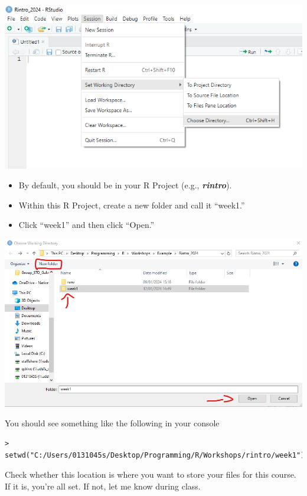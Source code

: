 \documentclass[
]{book}
\providecommand{\tightlist}{%
  \setlength{\itemsep}{0pt}\setlength{\parskip}{0pt}}
\begin{document}
\includegraphics{img/01-wd.png}

\begin{itemize}
\tightlist
\item
  By default, you should be in your R Project (e.g., \textbf{\emph{rintro}}).
\end{itemize}

\begin{itemize}
\item
  Within this R Project, create a new folder and call it ``week1.''
\item
  Click ``week1'' and then click ``Open.''
\end{itemize}

\includegraphics{img/01-new_wd.png}

You should see something like the following in your console

\begin{verbatim}
> setwd("C:/Users/0131045s/Desktop/Programming/R/Workshops/rintro/week1")
\end{verbatim}

Check whether this location is where you want to store your files for this course. If it is, you're all set. If not, let me know during class.
\end{document}
